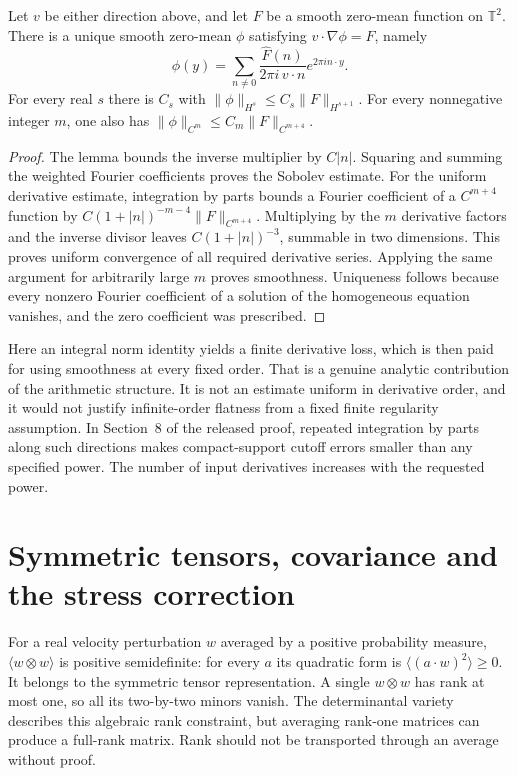 \begin{proposition}
\label{prop:fluid-fourier-inverse}
Let $v$ be either direction above, and let $F$ be a smooth zero-mean function on $\mathbb T^2$. There is a unique smooth zero-mean $\phi$ satisfying $v\cdot\nabla\phi=F$, namely
\[
 \phi(y)=\sum_{n\ne0}\frac{\widehat F(n)}{2\pi i\,v\cdot n}e^{2\pi i n\cdot y}.
\]
For every real $s$ there is $C_s$ with
$\|\phi\|_{H^s}\le C_s\|F\|_{H^{s+1}}$. For every nonnegative integer $m$, one also has $\|\phi\|_{C^m}\le C_m\|F\|_{C^{m+4}}$.
\end{proposition}
\begin{proof}
The lemma bounds the inverse multiplier by $C|n|$. Squaring and summing the weighted Fourier coefficients proves the Sobolev estimate. For the uniform derivative estimate, integration by parts bounds a Fourier coefficient of a $C^{m+4}$ function by $C(1+|n|)^{-m-4}\|F\|_{C^{m+4}}$. Multiplying by the $m$ derivative factors and the inverse divisor leaves $C(1+|n|)^{-3}$, summable in two dimensions. This proves uniform convergence of all required derivative series. Applying the same argument for arbitrarily large $m$ proves smoothness. Uniqueness follows because every nonzero Fourier coefficient of a solution of the homogeneous equation vanishes, and the zero coefficient was prescribed.
\end{proof}

Here an integral norm identity yields a finite derivative loss, which is then paid for using smoothness at every fixed order. That is a genuine analytic contribution of the arithmetic structure. It is not an estimate uniform in derivative order, and it would not justify infinite-order flatness from a fixed finite regularity assumption. In Section~8 of the released proof, repeated integration by parts along such directions makes compact-support cutoff errors smaller than any specified power. The number of input derivatives increases with the requested power.

\section{Symmetric tensors, covariance and the stress correction}

For a real velocity perturbation $w$ averaged by a positive probability measure, $\langle w\otimes w\rangle$ is positive semidefinite: for every $a$ its quadratic form is $\langle(a\cdot w)^2\rangle\ge0$. It belongs to the symmetric tensor representation. A single $w\otimes w$ has rank at most one, so all its two-by-two minors vanish. The determinantal variety describes this algebraic rank constraint, but averaging rank-one matrices can produce a full-rank matrix. Rank should not be transported through an average without proof.

